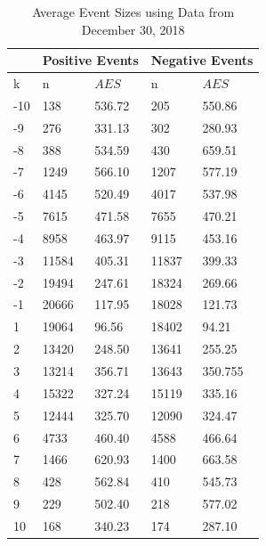 \begin{table}[htbp]
\caption{Average Event Sizes using Data from December 30, 2018} \label{tab:AES}
\begin{center}
\begin{tabular}{l|ll|ll}
\hline \hline
 & \multicolumn{2}{l|}{\textbf{Positive Events}} & \multicolumn{2}{l}{\textbf{Negative Events}} \\
\hline
k & n           & $AES$          & n           & $AES$          \\
\hline
-10         & 138        & 536.72        & 205         & 550.86             \\
-9         & 276        & 331.13         & 302         & 280.93             \\
-8         & 388        & 534.59         & 430         & 659.51             \\
-7         & 1249        & 566.10         & 1207         & 577.19             \\
-6         & 4145        & 520.49         & 4017         & 537.98             \\
-5         & 7615        & 471.58         & 7655         & 470.21             \\
-4         & 8958        & 463.97         & 9115         & 453.16             \\
-3         & 11584        & 405.31         & 11837         & 399.33             \\
-2         & 19494        & 247.61         & 18324         & 269.66             \\
-1         & 20666        & 117.95         & 18028         & 121.73             \\
1         & 19064        & 96.56         & 18402         & 94.21             \\
2         & 13420        & 248.50         & 13641         & 255.25             \\
3         & 13214        & 356.71         & 13643         & 350.755             \\
4         & 15322        & 327.24         & 15119         & 335.16             \\
5         & 12444        & 325.70         & 12090         & 324.47             \\
6         & 4733        & 460.40         & 4588         & 466.64             \\
7         & 1466        & 620.93         & 1400         & 663.58             \\
8         & 428        & 562.84         & 410         & 545.73             \\
9         & 229        & 502.40         & 218        & 577.02             \\
10         & 168        & 340.23         & 174         & 287.10             \\
\end{tabular}
\end{center}
\end{table}

